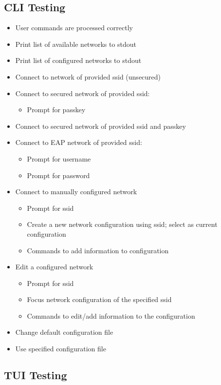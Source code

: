 \documentclass[11pt]{article}
\begin{document}
\subsection*{CLI Testing}
\begin{itemize}
  \item User commands are processed correctly
  \item Print list of available networks to stdout
  \item Print list of configured networks to stdout
  \item Connect to network of provided ssid (unsecured)
  \item Connect to secured network of provided ssid:
    \begin{itemize}
      \item Prompt for passkey
    \end{itemize}

  \item Connect to secured network of provided ssid and passkey
  \item Connect to EAP network of provided ssid:
    \begin{itemize}
      \item Prompt for username
      \item Prompt for password
    \end{itemize}

  \item Connect to manually configured network
    \begin{itemize}
      \item Prompt for ssid
      \item Create a new network configuration using ssid; select as current configuration
      \item Commands to add information to configuration
    \end{itemize}

  \item Edit a configured network
    \begin{itemize}
      \item Prompt for ssid
      \item Focus network configuration of the specified ssid
      \item Commands to edit/add information to the configuration
    \end{itemize}
  \item Change default configuration file
  \item Use specified configuration file
\end{itemize}

\subsection*{TUI Testing}
\end{document}
